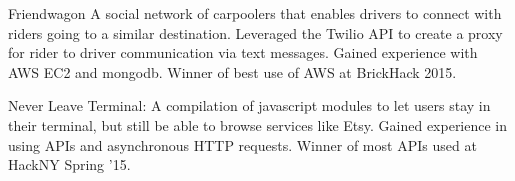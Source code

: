 \documentclass[11pt]{article}
\begin{document}
\inlineheadsection
  {Friendwagon}
  { A social network of carpoolers that enables drivers to connect with riders going to a similar destination.  Leveraged the Twilio API to create a proxy for rider to driver communication via text messages.  Gained experience with AWS EC2 and mongodb.  Winner of best use of AWS at BrickHack 2015. }

\inlineheadsection
	{Never Leave Terminal:}
	{ A compilation of javascript modules to let users stay in their terminal, but still be able to browse services like Etsy.  Gained experience in using APIs and asynchronous HTTP requests.  Winner of most APIs used at HackNY Spring '15. }


\end{document}
